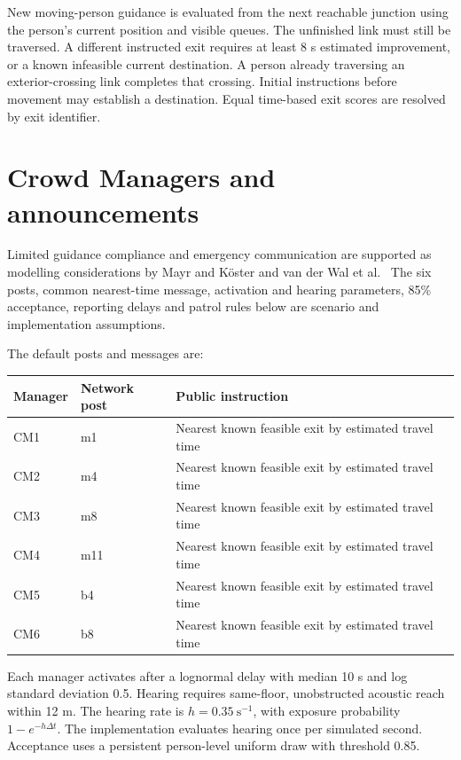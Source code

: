 \documentclass[11pt,a4paper]{article}
\begin{document}
New moving-person guidance is evaluated from the next reachable junction using the person's current position and visible queues. The unfinished link must still be traversed. A different instructed exit requires at least 8 s estimated improvement, or a known infeasible current destination. A person already traversing an exterior-crossing link completes that crossing. Initial instructions before movement may establish a destination. Equal time-based exit scores are resolved by exit identifier.

\section{Crowd Managers and announcements}
Limited guidance compliance and emergency communication are supported as modelling considerations by Mayr and K\"oster and van der Wal et al.~\cite{mayr,vanderwal} The six posts, common nearest-time message, activation and hearing parameters, 85\% acceptance, reporting delays and patrol rules below are scenario and implementation assumptions.~\cite{model,implementation}

The default posts and messages are:
\begin{center}\small
\begin{tabularx}{\linewidth}{llX}\toprule
Manager & Network post & Public instruction\\\midrule
CM1 & m1 & Nearest known feasible exit by estimated travel time\\
CM2 & m4 & Nearest known feasible exit by estimated travel time\\
CM3 & m8 & Nearest known feasible exit by estimated travel time\\
CM4 & m11 & Nearest known feasible exit by estimated travel time\\
CM5 & b4 & Nearest known feasible exit by estimated travel time\\
CM6 & b8 & Nearest known feasible exit by estimated travel time\\\bottomrule
\end{tabularx}
\end{center}

Each manager activates after a lognormal delay with median 10 s and log standard deviation 0.5. Hearing requires same-floor, unobstructed acoustic reach within 12 m. The hearing rate is $h=0.35\ \mathrm{s}^{-1}$, with exposure probability $1-e^{-h\Delta t}$. The implementation evaluates hearing once per simulated second. Acceptance uses a persistent person-level uniform draw with threshold 0.85.
\end{document}
